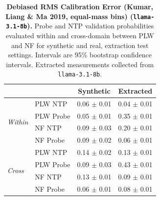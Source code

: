 \begin{table}[ht]
\centering
\begin{tabular}{ll cc}
\toprule
& & Synthetic & Extracted \\
\midrule
\multirow{4}{*}{\textit{Within}}
& PLW NTP & 0.06 $\pm$ 0.01 & 0.04 $\pm$ 0.01 \\
& PLW Probe & 0.05 $\pm$ 0.01 & 0.35 $\pm$ 0.01 \\
& NF NTP & 0.09 $\pm$ 0.03 & 0.20 $\pm$ 0.01 \\
& NF Probe & 0.09 $\pm$ 0.02 & 0.06 $\pm$ 0.01 \\
\midrule
\multirow{4}{*}{\textit{Cross}}
& PLW NTP & 0.14 $\pm$ 0.02 & 0.13 $\pm$ 0.01 \\
& PLW Probe & 0.09 $\pm$ 0.03 & 0.43 $\pm$ 0.01 \\
& NF NTP & 0.13 $\pm$ 0.01 & 0.09 $\pm$ 0.01 \\
& NF Probe & 0.06 $\pm$ 0.01 & 0.08 $\pm$ 0.01 \\
\bottomrule
\end{tabular}
\caption{\textbf{Debiased RMS Calibration Error (Kumar, Liang \& Ma 2019, equal-mass bins) (\texttt{llama-3.1-8b}).} Probe and NTP validation probabilities evaluated within and cross-domain between PLW and NF for synthetic and real, extraction test settings. Intervals are 95\% bootstrap confidence intervals. Extracted measurements collected from \texttt{llama-3.1-8b}.}
\label{tab:llama-3.1-8b-llama-3.1-8b-pond_nfix-rmsce_db}
\end{table}
